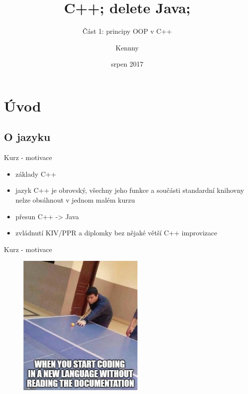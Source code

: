 \documentclass{beamer}
\begin{document}
\title{C++; delete Java;}
\subtitle{Část 1: principy OOP v C++}
\author{Kennny}
\date{srpen 2017}

\frame{\titlepage}


\newenvironment{xframe}[1][]
  {\begin{frame}[fragile,environment=xframe,#1]}
  {\end{frame}}

\section{Úvod}
\subsection{O jazyku}


\begin{xframe}{Kurz - motivace}
	\begin{itemize}
		\item základy C++
		\item jazyk C++ je obrovský, všechny jeho funkce a součásti standardní knihovny nelze obsáhnout v jednom malém kurzu
		\item přesun C++ -> Java
		\item zvládnutí KIV/PPR a diplomky bez nějaké větší C++ improvizace
	\end{itemize}
\end{xframe}

\begin{xframe}{Kurz - motivace}
	\begin{figure}
		\centering
		\includegraphics[width=0.55\textwidth]{newlang.png}
	\end{figure}
\end{xframe}
\end{document}
